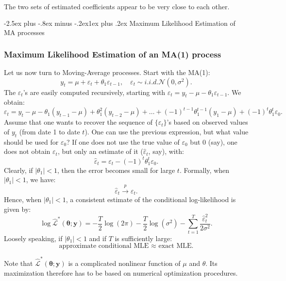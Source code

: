 \documentclass[
  11pt,
]{book}
\makeatletter
\renewcommand\subsection{\@startsection{subsection}{2}{\z@}
  {-2.5ex plus -.8ex minus -.2ex}{1ex plus .2ex}
  {\normalfont\large\bfseries\color{TextbookInk}}}
\theoremstyle{definition}
\theoremstyle{definition}
\theoremstyle{definition}
\theoremstyle{definition}
\theoremstyle{remark}
\makeatother
\begin{document}
The two sets of estimated coefficients appear to be very close to each other.

\subsection{Maximum Likelihood Estimation of MA processes}\label{estimMA}

\subsubsection{Maximum Likelihood Estimation of an MA(1) process}\label{estimMA1}

Let us now turn to Moving-Average processes. Start with the MA(1):
\[
y_t = \mu + \varepsilon_t + \theta_1 \varepsilon_{t-1},\quad \varepsilon_t \sim i.i.d.\mathcal{N}(0,\sigma^2).
\]
The \(\varepsilon_t\)'s are easily computed recursively, starting with \(\varepsilon_t = y_t - \mu - \theta_1 \varepsilon_{t-1}\). We obtain:
\[
\varepsilon_t = y_t-\mu - \theta_1 (y_{t-1}-\mu) + \theta_1^2 (y_{t-2}-\mu) + \dots + (-1)^{t-1} \theta_1^{t-1} (y_{1}-\mu) + (-1)^t\theta_1^{t}\varepsilon_{0}.
\]
Assume that one wants to recover the sequence of \(\{\varepsilon_t\}\)'s based on observed values of \(y_t\) (from date 1 to date \(t\)). One can use the previous expression, but what value should be used for \(\varepsilon_0\)? If one does not use the true value of \(\varepsilon_0\) but 0 (say), one does not obtain \(\varepsilon_t\), but only an estimate of it (\(\hat\varepsilon_t\), say), with:
\[
\hat\varepsilon_t = \varepsilon_t - (-1)^t\theta_1^{t}\varepsilon_{0}.
\]
Clearly, if \(|\theta_1|<1\), then the error becomes small for large \(t\). Formally, when \(|\theta_1|<1\), we have:
\[
\hat\varepsilon_t \overset{p}{\rightarrow} \varepsilon_t.
\]
Hence, when \(|\theta_1|<1\), a consistent estimate of the conditional log-likelihood is given by:
\begin{equation}
\log \hat{\mathcal{L}}^*(\boldsymbol\theta;\mathbf{y}) = -\frac{T}{2}\log(2\pi) - \frac{T}{2}\log(\sigma^2) - \sum_{t=1}^T \frac{\hat\varepsilon_t^2}{2\sigma^2}.\label{eq:MALstar}
\end{equation}
Loosely speaking, if \(|\theta_1|<1\) and if \(T\) is sufficiently large:
\[
\mbox{approximate conditional MLE $\approx$ exact MLE.}
\]

Note that \(\hat{\mathcal{L}}^*(\boldsymbol\theta;\mathbf{y})\) is a complicated nonlinear function of \(\mu\) and \(\theta\). Its maximization therefore has to be based on numerical optimization procedures.
\end{document}
